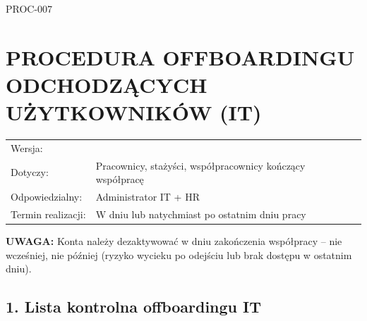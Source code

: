 \documentclass[12pt,a4paper]{article}
\begin{document}
\label{doc7}
PROC-007

\section{PROCEDURA OFFBOARDINGU ODCHODZĄCYCH UŻYTKOWNIKÓW
(IT)}\label{procedura-offboardingu-odchodzux105cych-uux17cytkownikuxf3w-it}

\begin{longtable}[]{@{}>{\raggedright\arraybackslash}p{}>{\raggedright\arraybackslash}p{}@{}}
\toprule\noalign{}
\endhead
\bottomrule\noalign{}
\endlastfoot
Wersja: & 1.0 \\
Dotyczy: & Pracownicy, stażyści, współpracownicy kończący współpracę \\
Odpowiedzialny: & Administrator IT + HR \\
Termin realizacji: & W dniu lub natychmiast po ostatnim dniu pracy \\
\end{longtable}

\textbf{UWAGA:} Konta należy dezaktywować w dniu zakończenia współpracy -- nie
wcześniej, nie później (ryzyko wycieku po odejściu lub brak dostępu w
ostatnim dniu).

\subsection{1. Lista kontrolna offboardingu
IT}\label{lista-kontrolna-offboardingu-it}
\end{document}
